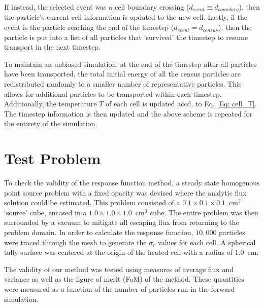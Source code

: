 If instead, the selected event was a cell boundary crossing ($d_{event} \equiv d_{boundary}$), then the particle's current cell information is updated to the new cell. Lastly, if the event is the particle reaching the end of the timestep ($d_{event} = d_{census}$), then the particle is put into a list of all particles that `survived' the timestep to resume transport in the next timestep. 

To maintain an unbiased simulation, at the end of the timestep after all particles have been transported, the total initial energy of all the census particles are redistributed randomly to a smaller number of representative particles. This allows for additional particles to be transported within each timestep. Additionally, the temperature $T$ of each cell is updated accd. to Eq. \ref{Eq: cell_T}. The timestep information is then updated and the above scheme is repeated for the entirety of the simulation. 

\section{Test Problem}
To check the validity of the response function method, a steady state homogenous point source problem with a fixed opacity was devised where the analytic flux solution could be estimated. This problem consisted of a $0.1 \times 0.1 \times 0.1$~cm$^3$ `source' cube, encased in a $1.0 \times 1.0 \times 1.0$~cm$^3$ cube. The entire problem was then surrounded by a vacuum to mitigate all escaping flux from returning to the problem domain. In order to calculate the response function, $10,000$ particles were traced through the mesh to generate the $\sigma_{r}$ values for each cell. A spherical tally surface was centered at the origin of the heated cell with a radius of $1.0$~cm. 

The validity of our method was tested using measures of average flux and variance as well as the figure of merit (FoM) of the method. These quantities were measured as a function of the number of particles run in the forward simulation. 

